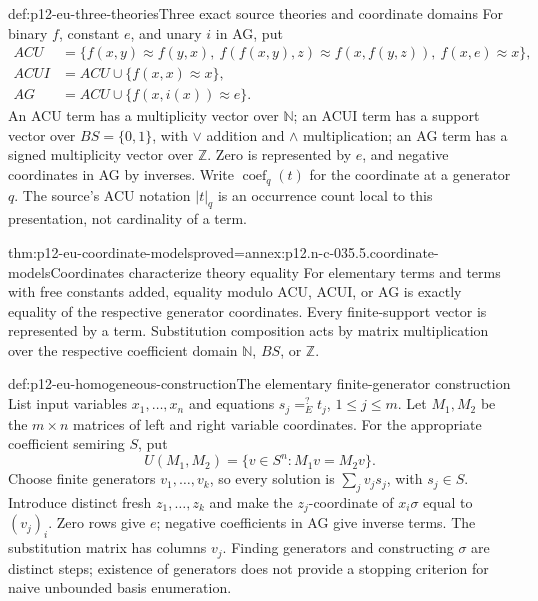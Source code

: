 \begin{hbdefinition}{def:p12-eu-three-theories}{Three exact source theories and coordinate domains}
For binary \(f\), constant \(e\), and unary \(i\) in AG, put
\[
\begin{aligned}
 ACU&=\{f(x,y)\approx f(y,x),\ f(f(x,y),z)\approx f(x,f(y,z)),\
                          f(x,e)\approx x\},\\
 ACUI&=ACU\cup\{f(x,x)\approx x\},\\
 AG&=ACU\cup\{f(x,i(x))\approx e\}.
\end{aligned}
\]
An ACU term has a multiplicity vector over \(\mathbb N\); an ACUI
term has a support vector over \(BS=\{0,1\}\), with \(\lor\)
addition and \(\land\) multiplication; an AG term has a signed
multiplicity vector over \(\mathbb Z\). Zero is represented by
\(e\), and negative coordinates in AG by inverses. Write
\(\operatorname{coef}_q(t)\) for the coordinate at a generator \(q\).
The source's ACU notation \(|t|_q\) is an occurrence count local to
this presentation, not cardinality of a term.
\cite[\S5.1, pp.~504--506]{BaaderSnyder2001}
\end{hbdefinition}

\begin{hblemma}{thm:p12-eu-coordinate-models}{proved=annex:p12.n-c-035.5.coordinate-models}{Coordinates characterize theory equality}
For elementary terms and terms with free constants added, equality modulo
ACU, ACUI, or AG is exactly equality of the respective generator
coordinates. Every finite-support vector is represented by a term.
Substitution composition acts by matrix multiplication over the respective
coefficient domain \(\mathbb N\), \(BS\), or \(\mathbb Z\).
\end{hblemma}

\begin{hbmethod}{def:p12-eu-homogeneous-construction}{The elementary finite-generator construction}
List input variables \(x_1,\ldots,x_n\) and equations
\(s_j=^{?}_E t_j\), \(1\leq j\leq m\). Let \(M_1,M_2\)
be the \(m\times n\) matrices of left and right variable coordinates.
For the appropriate coefficient semiring \(S\), put
\[
                U(M_1,M_2)=\{v\in S^n:M_1v=M_2v\}.
\]
Choose finite generators \(v_1,\ldots,v_k\), so every solution is
\(\sum_jv_js_j\), with \(s_j\in S\). Introduce distinct fresh
\(z_1,\ldots,z_k\) and make the \(z_j\)-coordinate of
\(x_i\sigma\) equal to \((v_j)_i\). Zero rows give \(e\);
negative coefficients in AG give inverse terms. The substitution matrix
has columns \(v_j\). Finding generators and constructing \(\sigma\)
are distinct steps; existence of generators does not provide a stopping
criterion for naive unbounded basis enumeration.
\cite[pp.~505--506 and Theorem 5.4, p.~511]{BaaderSnyder2001}
\end{hbmethod}


